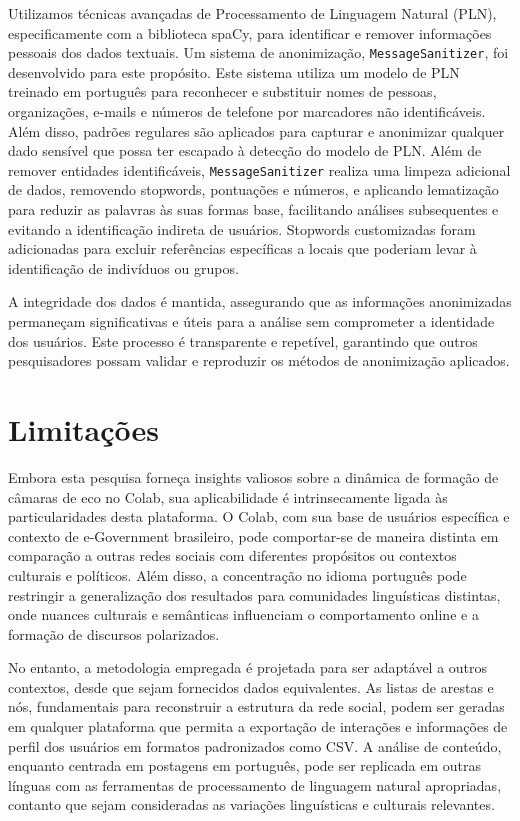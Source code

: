 Utilizamos técnicas avançadas de Processamento de Linguagem Natural (PLN), especificamente com a biblioteca spaCy, para identificar e remover informações pessoais dos dados textuais. Um sistema de anonimização, \texttt{MessageSanitizer}, foi desenvolvido para este propósito. Este sistema utiliza um modelo de PLN treinado em português para reconhecer e substituir nomes de pessoas, organizações, e-mails e números de telefone por marcadores não identificáveis. Além disso, padrões regulares são aplicados para capturar e anonimizar qualquer dado sensível que possa ter escapado à detecção do modelo de PLN. Além de remover entidades identificáveis, \texttt{MessageSanitizer} realiza uma limpeza adicional de dados, removendo stopwords, pontuações e números, e aplicando lematização para reduzir as palavras às suas formas base, facilitando análises subsequentes e evitando a identificação indireta de usuários. Stopwords customizadas foram adicionadas para excluir referências específicas a locais que poderiam levar à identificação de indivíduos ou grupos.

A integridade dos dados é mantida, assegurando que as informações anonimizadas permaneçam significativas e úteis para a análise sem comprometer a identidade dos usuários. Este processo é transparente e repetível, garantindo que outros pesquisadores possam validar e reproduzir os métodos de anonimização aplicados.

\section{Limitações}

Embora esta pesquisa forneça insights valiosos sobre a dinâmica de formação de câmaras de eco no Colab, sua aplicabilidade é intrinsecamente ligada às particularidades desta plataforma. O Colab, com sua base de usuários específica e contexto de e-Government brasileiro, pode comportar-se de maneira distinta em comparação a outras redes sociais com diferentes propósitos ou contextos culturais e políticos. Além disso, a concentração no idioma português pode restringir a generalização dos resultados para comunidades linguísticas distintas, onde nuances culturais e semânticas influenciam o comportamento online e a formação de discursos polarizados.

No entanto, a metodologia empregada é projetada para ser adaptável a outros contextos, desde que sejam fornecidos dados equivalentes. As listas de arestas e nós, fundamentais para reconstruir a estrutura da rede social, podem ser geradas em qualquer plataforma que permita a exportação de interações e informações de perfil dos usuários em formatos padronizados como CSV. A análise de conteúdo, enquanto centrada em postagens em português, pode ser replicada em outras línguas com as ferramentas de processamento de linguagem natural apropriadas, contanto que sejam consideradas as variações linguísticas e culturais relevantes.

